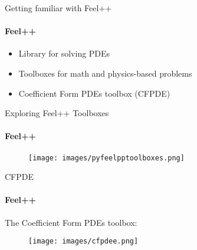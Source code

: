 \documentclass{beamer}
\begin{document}
\begin{frame}{Getting familiar with Feel++}
\framesubtitle{Feel++}

\begin{itemize}
    \item Library for solving PDEs
    \item Toolboxes for math and physics-based problems
    \item Coefficient Form PDEs toolbox (CFPDE)
\end{itemize} 
\end{frame}


\begin{frame}{Exploring Feel++ Toolboxes}
\framesubtitle{Feel++}

    \begin{figure}
        \centering
        \texttt{[image: images/pyfeelpptoolboxes.png]}
    \end{figure}
\end{frame}

\begin{frame}{CFPDE}
\framesubtitle{Feel++}
The Coefficient Form PDEs toolbox:

\begin{figure}
        \centering
        \texttt{[image: images/cfpdee.png]}
\end{figure}

\end{frame}

\begin{comment}


ScimBa offers a Python library that merges machine learning with scientific computing



Neural Networks: MLP, RBF, and Fourier networks.
Sampling: Uniform methods for PINNs and complex geometries.
Trainers: Specific to each PDE type.
Neural Galerkin: Applies to time PDEs.
\end{comment}
\begin{frame}[plain]
\begin{center}
\end{center}

\end{frame}
\end{document}
